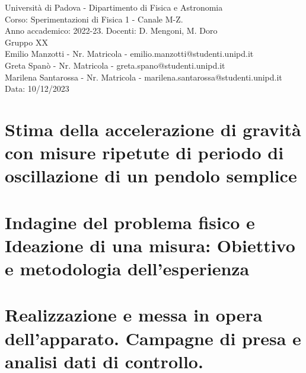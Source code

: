 \documentclass{article}
\begin{document}
\noindent\makebox[\linewidth]{\rule{\textwidth}{0.4pt}}

\begin{center}
{\Large Università di Padova - Dipartimento di Fisica e Astronomia} \\[1em]
{\large Corso: Sperimentazioni di Fisica 1 - Canale M-Z.} \\
{\large Anno accademico: 2022-23. Docenti: D. Mengoni, M. Doro} \\[2em]

Gruppo XX \\
Emilio Manzotti - Nr. Matricola - emilio.manzotti@studenti.unipd.it \\
Greta Spanò - Nr. Matricola - greta.spano@studenti.unipd.it \\
Marilena Santarossa - Nr. Matricola - marilena.santarossa@studenti.unipd.it \\[1em]
Data: 10/12/2023
\end{center}

\noindent\makebox[\linewidth]{\rule{\textwidth}{0.4pt}}

\vspace{2em}

\section*{Stima della accelerazione di gravità con misure ripetute di periodo di oscillazione di un pendolo semplice}


\section{Indagine del problema fisico e Ideazione di una misura: Obiettivo e metodologia dell’esperienza}


\section{Realizzazione e messa in opera dell’apparato. Campagne di presa e analisi dati di controllo.}
\end{document}

